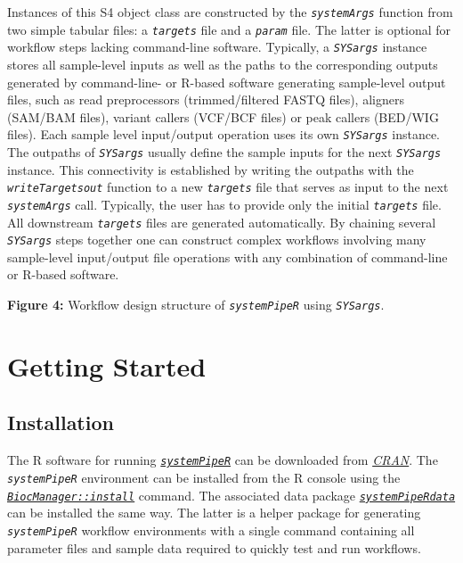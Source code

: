 \documentclass[14pt,]{article}
\begin{document}
Instances of this S4 object class are constructed by the \emph{\texttt{systemArgs}} function
from two simple tabular files: a \emph{\texttt{targets}} file and a \emph{\texttt{param}} file. The latter
is optional for workflow steps lacking command-line software. Typically, a
\emph{\texttt{SYSargs}} instance stores all sample-level inputs as well as the paths to the
corresponding outputs generated by command-line- or R-based software generating
sample-level output files, such as read preprocessors (trimmed/filtered FASTQ
files), aligners (SAM/BAM files), variant callers (VCF/BCF files) or peak callers
(BED/WIG files). Each sample level input/output operation uses its own \emph{\texttt{SYSargs}}
instance. The outpaths of \emph{\texttt{SYSargs}} usually define the sample inputs for the
next \emph{\texttt{SYSargs}} instance. This connectivity is established by writing the
outpaths with the \emph{\texttt{writeTargetsout}} function to a new \emph{\texttt{targets}} file that
serves as input to the next \emph{\texttt{systemArgs}} call. Typically, the user has to
provide only the initial \emph{\texttt{targets}} file. All downstream \emph{\texttt{targets}} files are
generated automatically. By chaining several \emph{\texttt{SYSargs}} steps together one can
construct complex workflows involving many sample-level input/output file
operations with any combination of command-line or R-based software.

\textbf{Figure 4:} Workflow design structure of \emph{\texttt{systemPipeR}} using \emph{\texttt{SYSargs}}.

\hypertarget{getting-started}{%
\section{Getting Started}\label{getting-started}}

\hypertarget{installation}{%
\subsection{Installation}\label{installation}}

The R software for running \href{http://www.bioconductor.org/packages/devel/bioc/html/systemPipeR.html}{\emph{\texttt{systemPipeR}}} can be downloaded from \href{http://cran.at.r-project.org/}{\emph{CRAN}}. The \emph{\texttt{systemPipeR}} environment can be installed from the R console using the \href{https://cran.r-project.org/web/packages/BiocManager/index.html}{\emph{\texttt{BiocManager::install}}} command. The associated data package \href{http://www.bioconductor.org/packages/devel/data/experiment/html/systemPipeRdata.html}{\emph{\texttt{systemPipeRdata}}} can be installed the same way. The latter is a helper package for generating \emph{\texttt{systemPipeR}} workflow environments with a single command containing all parameter files and sample data required to quickly test and run workflows.
\end{document}
